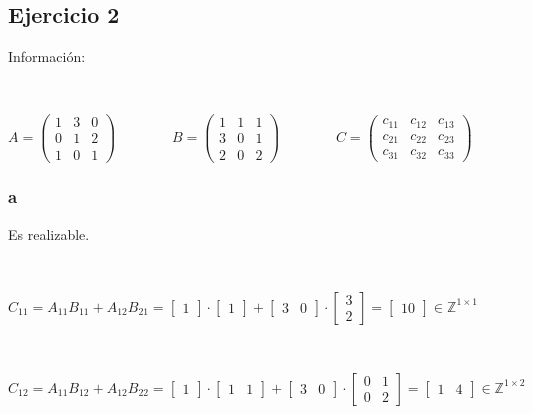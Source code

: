 \documentclass{article}
\begin{document}
\subsection*{Ejercicio 2}

Información:

\

\begin{center}
$A = \begin{pmatrix}
    1 & 3 & 0 \\
    0 & 1 & 2 \\
    1 & 0 & 1
\end{pmatrix} 
~~~~~~~~~~~~~~~~~~
B = \begin{pmatrix}
    1 & 1 & 1 \\
    3 & 0 & 1 \\
    2 & 0 & 2
\end{pmatrix}
~~~~~~~~~~~~~~~~~~
C = \begin{pmatrix}
    c_{11} & c_{12} & c_{13} \\
    c_{21} & c_{22} & c_{23} \\
    c_{31} & c_{32} & c_{33}
\end{pmatrix}$
\end{center}

\subsubsection*{a}
Es realizable.

\

$C_{11} = A_{11}B_{11} + A_{12}B_{21} =  
\begin{bmatrix}
    1    
\end{bmatrix}
\cdot
\begin{bmatrix}
    1
\end{bmatrix}
+
\begin{bmatrix}
    3 & 0
\end{bmatrix}
\cdot
\begin{bmatrix}
    3 \\
    2
\end{bmatrix} 
=
\begin{bmatrix}
    10
\end{bmatrix} \in \mathbb{Z}^{1\times 1}$

\

$C_{12} = A_{11}B_{12} + A_{12}B_{22} =  
\begin{bmatrix}
    1    
\end{bmatrix}
\cdot
\begin{bmatrix}
    1 & 1
\end{bmatrix}
+
\begin{bmatrix}
    3 & 0
\end{bmatrix}
\cdot
\begin{bmatrix}
    0 & 1 \\
    0 & 2
\end{bmatrix}
=
\begin{bmatrix}
    1 & 4
\end{bmatrix} \in \mathbb{Z}^{1\times 2}$
\end{document}
